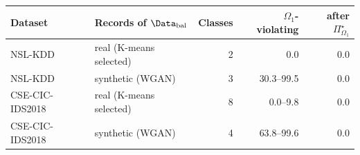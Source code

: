 \begin{tabular}{@{}llrrr@{}}
\toprule
Dataset & Records of $\Data_{\mathrm{bal}}$ & Classes & $\Omega_1$-violating & after $\Pi^{\star}_{\Omega_1}$\\
\midrule
NSL-KDD & real (K-means selected) & 2 & 0.0 & 0.0\\
NSL-KDD & synthetic (WGAN) & 3 & 30.3--99.5 & 0.0\\
CSE-CIC-IDS2018 & real (K-means selected) & 8 & 0.0--9.8 & 0.0\\
CSE-CIC-IDS2018 & synthetic (WGAN) & 4 & 63.8--99.6 & 0.0\\
\bottomrule
\end{tabular}
